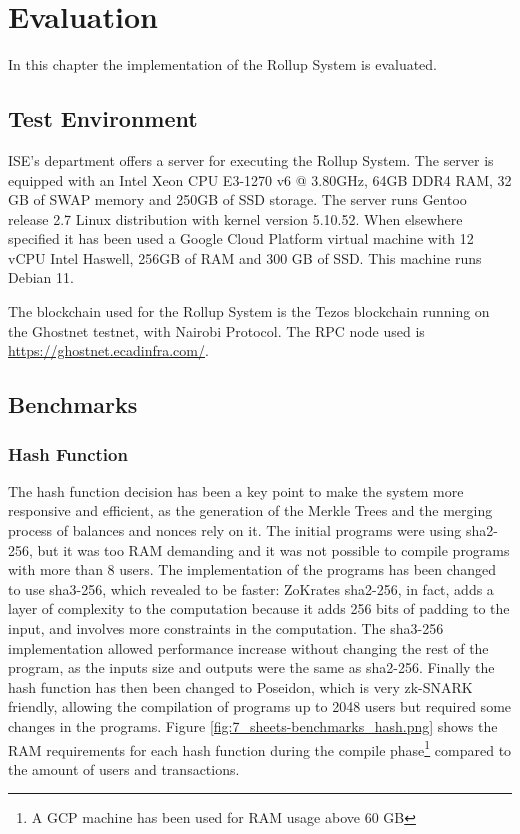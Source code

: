 \chapter{Evaluation\label{cha:chapter7}}

In this chapter the implementation of the Rollup System is evaluated.



\section{Test Environment\label{sec:testenvir}}

ISE's department offers a server for executing the Rollup System. The server is equipped with an Intel Xeon CPU E3-1270 v6 @ 3.80GHz, 64GB DDR4 RAM, 32 GB of SWAP memory and 250GB of SSD storage. The server runs Gentoo release 2.7 Linux distribution with kernel version 5.10.52. When elsewhere specified it has been used a Google Cloud Platform virtual machine with 12 vCPU Intel Haswell, 256GB of RAM and 300 GB of SSD. This machine runs Debian 11.

The blockchain used for the Rollup System is the Tezos blockchain running on the Ghostnet testnet, with Nairobi Protocol. The RPC node used is \url{https://ghostnet.ecadinfra.com/}.


\section{Benchmarks\label{sec:benchmarks}}

\subsection{Hash Function\label{subsec:6_hashfunc}}

The hash function decision has been a key point to make the system more responsive and efficient, as the generation of the Merkle Trees and the merging process of balances and nonces rely on it. The initial programs were using sha2-256, but it was too RAM demanding and it was not possible to compile programs with more than 8 users. The implementation of the programs has been changed to use sha3-256, which revealed to be faster: ZoKrates sha2-256, in fact, adds a layer of complexity to the computation because it adds 256 bits of padding to the input, and involves more constraints in the computation. The sha3-256 implementation allowed performance increase without changing the rest of the program, as the inputs size and outputs were the same as sha2-256.
Finally the hash function has then been changed to Poseidon, which is very zk-SNARK friendly, allowing the compilation of programs up to 2048 users but required some changes in the programs. Figure \ref{fig:7_sheets-benchmarks_hash.png} shows the RAM requirements for each hash function during the compile phase\footnote{A GCP machine has been used for RAM usage above 60 GB} compared to the amount of users and transactions.


